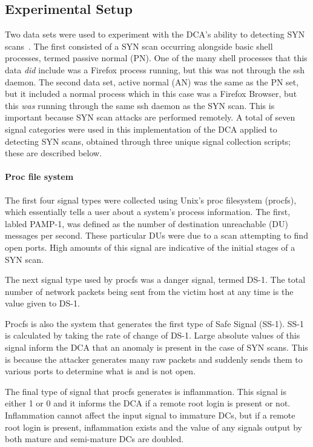 \documentclass{umm-senior-sem}
\begin{document}
\subsection{Experimental Setup}
\label{sec:expSetup}
Two data sets were used to experiment with the DCA's ability to detecting SYN scans~\cite{greensmith_thesis:2007}. The first consisted of a SYN scan occurring alongside basic shell processes, termed passive normal (PN). One of the many shell processes that this data \textit{did} include was a Firefox process running, but this was not through the ssh daemon. The second data set, active normal (AN) was the same as the PN set, but it included a normal process which in this case was a Firefox Browser, but this \textit{was} running through the same ssh daemon as the SYN scan. This is important because SYN scan attacks are performed remotely. 
A total of seven signal categories were used in this implementation of the DCA applied to detecting SYN scans, obtained through three unique signal collection scripts; these are described below.
\paragraph{Proc file system}
The first four signal types were collected using Unix's proc filesystem (procfs), which essentially tells a user about a system's process information. 
The first, labled PAMP-1, was defined as the number of destination unreachable (DU) messages per second. These particular DUs were due to a scan attempting to find open ports. High amounts of this signal are indicative of the initial stages of a SYN scan. 

The next signal type used by procfs was a danger signal, termed DS-1. The total number of network packets being sent from the victim host at any time is the value given to DS-1. 

Procfs is also the system that generates the first type of Safe Signal (SS-1). SS-1 is calculated by taking the rate of change of DS-1. Large absolute values of this signal inform the DCA that an anomaly is present in the case of SYN scans. 
This is because the attacker generates many raw packets and suddenly sends them to various ports to determine what is and is not open. 

The final type of signal that procfs generates is inflammation. This signal is either 1 or 0 and it informs the DCA if a remote root login is present or not. 
Inflammation cannot affect the input signal to immature DCs, but if a remote root login is present, inflammation exists and the value of any signals output by both mature and semi-mature DCs are doubled.
\end{document}

